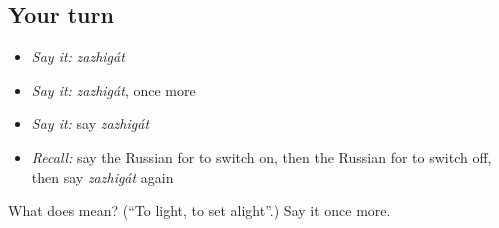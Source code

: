 \subsection*{Your turn}
\begin{itemize}
\raggedright
  \item \emph{Say it:} \emph{zazhigát}
  \item \emph{Say it:} \emph{zazhigát}, once more
  \item \emph{Say it:} say \emph{zazhigát}
  \item \emph{Recall:} say the Russian for to switch on, then the Russian for to switch off, then say \emph{zazhigát} again
\end{itemize}

\begin{tcolorbox}[breakable,colback=teal!4,colframe=teal!35!black,title={Before you move on}]
What does  mean? (\textquotedblleft{}To light, to set alight\textquotedblright{}.) Say it once more.
\end{tcolorbox}
